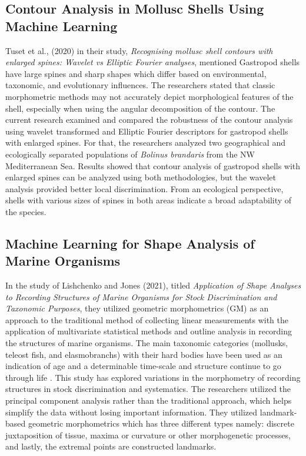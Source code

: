 \subsection{Contour Analysis in Mollusc Shells Using Machine Learning}
Tuset et al., (2020) in their study, \textit{Recognising mollusc shell contours with enlarged spines: Wavelet vs Elliptic Fourier analyses}, mentioned Gastropod shells have large spines and sharp shapes which differ based on environmental, taxonomic, and evolutionary influences. The researchers stated that classic morphometric methods may not accurately depict morphological features of the shell, especially when using the angular decomposition of the contour. The current research examined and compared the robustness of the contour analysis using wavelet transformed and Elliptic Fourier descriptors for gastropod shells with enlarged spines. For that, the researchers analyzed two geographical and ecologically separated populations of \textit{Bolinus brandaris} from the NW Mediterranean Sea. Results showed that contour analysis of gastropod shells with enlarged spines can be analyzed using both methodologies, but the wavelet analysis provided better local discrimination. From an ecological perspective, shells with various sizes of spines in both areas indicate a broad adaptability of the species.

\subsection{Machine Learning for Shape Analysis of Marine Organisms}
In the study of Lishchenko and Jones (2021), titled \textit{Application of Shape Analyses to Recording Structures of Marine Organisms for Stock Discrimination and Taxonomic Purposes}, they utilized geometric morphometrics (GM) as an approach to the traditional method of collecting linear measurements with the application of multivariate statistical methods and outline analysis in recording the structures of marine organisms. The main taxonomic categories (mollusks, teleost fish, and elasmobranchs) with their hard bodies have been used as an indication of age and a determinable time-scale and structure continue to go through life \cite{arkhipkin2005, kerr2014}. This study has explored variations in the morphometry of recording structures in stock discrimination and systematics. The researchers utilized the principal component analysis rather than the traditional approach, which helps simplify the data without losing important information. They utilized landmark-based geometric morphometrics which has three different types namely: discrete juxtaposition of tissue, maxima or curvature or other morphogenetic processes, and lastly, the extremal points are constructed landmarks.

